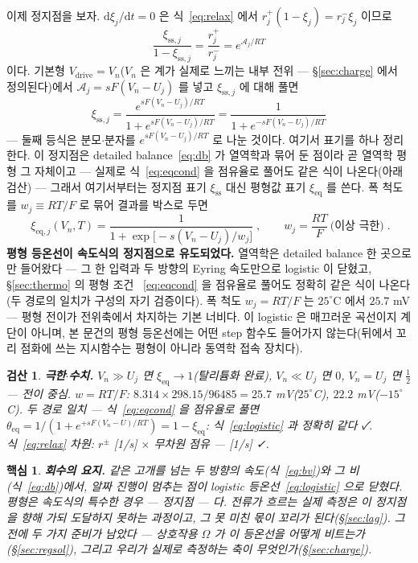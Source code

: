 \documentclass[11pt,a4paper]{article}
\newtheorem*{keybox}{핵심}
\newtheorem*{verifybox}{검산}
\newcommand{\dd}{\mathrm{d}}
\newcommand{\eq}{\mathrm{eq}}
\newcommand{\drive}{\mathrm{drive}}
\newcommand{\sstat}{\mathrm{ss}}
\begin{document}
이제 정지점을 보자. $\dd\xi_j/\dd t=0$ 은 식~\eqref{eq:relax} 에서
$r_j^+(1-\xi_j)=r_j^-\xi_j$ 이므로
\begin{equation}
\frac{\xi_{\sstat,j}}{1-\xi_{\sstat,j}}=\frac{r_j^+}{r_j^-}=e^{\mathcal A_j/RT}
\label{eq:stationary}
\end{equation}
이다. 기본형 $V_\drive=V_n$($V_n$ 은 계가 실제로 느끼는 내부 전위 — \S\ref{sec:charge} 에서
정의된다)에서 $\mathcal A_j=sF(V_n-U_j)$ 를 넣고 $\xi_{\sstat,j}$ 에 대해 풀면
\begin{equation}
\xi_{\sstat,j}
=\frac{e^{sF(V_n-U_j)/RT}}{1+e^{sF(V_n-U_j)/RT}}
=\frac{1}{1+e^{-sF(V_n-U_j)/RT}}
\label{eq:logisticsolve}
\end{equation}
— 둘째 등식은 분모$\cdot$분자를 $e^{sF(V_n-U_j)/RT}$ 로 나눈 것이다. 여기서 표기를 하나 정리한다.
이 정지점은 detailed balance~\eqref{eq:db} 가 열역학과 묶어 둔 점이라 곧 열역학 평형 그 자체이고
— 실제로 식~\eqref{eq:eqcond} 을 점유율로 풀어도 같은 식이 나온다(아래 검산) — 그래서 여기서부터는
정지점 표기 $\xi_{\sstat}$ 대신 평형값 표기 $\xi_{\eq}$ 를 쓴다. 폭 척도를 $w_j\equiv RT/F$ 로
묶어 결과를 박스로 두면
\begin{equation}
\boxed{\;\xi_{\eq,j}(V_n,T)=\frac{1}{1+\exp\!\big[-s(V_n-U_j)/w_j\big]}\;,\qquad
w_j=\frac{RT}{F}\ \text{(이상 극한)}\;.}
\label{eq:logistic}
\end{equation}
\textbf{평형 등온선이 속도식의 정지점으로 유도되었다.} 열역학은 detailed balance 한 곳으로만
들어왔다 — 그 한 입력과 두 방향의 Eyring 속도만으로 logistic 이 닫혔고, \S\ref{sec:thermo} 의 평형 조건
~\eqref{eq:eqcond} 을 점유율로 풀어도 정확히 같은 식이 나온다(두 경로의 일치가 구성의 자기 검증이다).
폭 척도 $w_j=RT/F$ 는 $25^\circ$C 에서 $25.7$ mV — 평형 전이가 전위축에서 차지하는 기본 너비다. 이
logistic 은 매끄러운 곡선이지 계단이 아니며, 본 문건의 평형 등온선에는 어떤 step 함수도 들어가지
않는다(뒤에서 꼬리 점화에 쓰는 지시함수는 평형이 아니라 동역학 접속 장치다).

\begin{verifybox}
\textbf{극한$\cdot$수치.} $V_n\gg U_j$ 면 $\xi_{\eq}\to1$(탈리튬화 완료), $V_n\ll U_j$ 면 $0$,
$V_n=U_j$ 면 $\tfrac12$ — 전이 중심. $w=RT/F$: $8.314\times298.15/96485=25.7$ mV($25^\circ$C),
$22.2$ mV($-15^\circ$C). 두 경로 일치 — 식~\eqref{eq:eqcond} 을 점유율로 풀면
$\theta_{\eq}=1/(1+e^{+sF(V_n-U)/RT})=1-\xi_{\eq}$: 식~\eqref{eq:logistic} 과 정확히 같다 ✓.
식~\eqref{eq:relax} 차원: $r^\pm$ [1/s] $\times$ 무차원 점유 — [1/s] ✓.
\end{verifybox}

\begin{keybox}
\textbf{회수의 요지.} 같은 고개를 넘는 두 방향의 속도(식~\eqref{eq:bv})와 그 비(식~\eqref{eq:db})에서,
알짜 진행이 멈추는 점이 logistic 등온선~\eqref{eq:logistic} 으로 닫혔다. 평형은 속도식의 특수한 경우 —
정지점 — 다. 전류가 흐르는 실제 측정은 이 정지점을 \emph{향해 가되 도달하지 못하는} 과정이고, 그 못 미친
몫이 꼬리가 된다(\S\ref{sec:lag}). 그 전에 두 가지 준비가 남았다 — 상호작용 $\Omega$ 가 이 등온선을
어떻게 비트는가(\S\ref{sec:regsol}), 그리고 우리가 실제로 측정하는 축이 무엇인가(\S\ref{sec:charge}).
\end{keybox}
\end{document}
